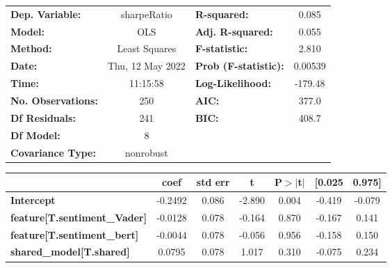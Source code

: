 \begin{center}
\begin{tabular}{lclc}
\toprule
\textbf{Dep. Variable:}                       &   sharpeRatio    & \textbf{  R-squared:         } &     0.085   \\
\textbf{Model:}                               &       OLS        & \textbf{  Adj. R-squared:    } &     0.055   \\
\textbf{Method:}                              &  Least Squares   & \textbf{  F-statistic:       } &     2.810   \\
\textbf{Date:}                                & Thu, 12 May 2022 & \textbf{  Prob (F-statistic):} &  0.00539    \\
\textbf{Time:}                                &     11:15:58     & \textbf{  Log-Likelihood:    } &   -179.48   \\
\textbf{No. Observations:}                    &         250      & \textbf{  AIC:               } &     377.0   \\
\textbf{Df Residuals:}                        &         241      & \textbf{  BIC:               } &     408.7   \\
\textbf{Df Model:}                            &           8      & \textbf{                     } &             \\
\textbf{Covariance Type:}                     &    nonrobust     & \textbf{                     } &             \\
\bottomrule
\end{tabular}
\begin{tabular}{lcccccc}
                                              & \textbf{coef} & \textbf{std err} & \textbf{t} & \textbf{P$> |$t$|$} & \textbf{[0.025} & \textbf{0.975]}  \\
\midrule
\textbf{Intercept}                            &      -0.2492  &        0.086     &    -2.890  &         0.004        &       -0.419    &       -0.079     \\
\textbf{feature[T.sentiment\_Vader]}          &      -0.0128  &        0.078     &    -0.164  &         0.870        &       -0.167    &        0.141     \\
\textbf{feature[T.sentiment\_bert]}           &      -0.0044  &        0.078     &    -0.056  &         0.956        &       -0.158    &        0.150     \\
\textbf{shared\_model[T.shared]}              &       0.0795  &        0.078     &     1.017  &         0.310        &       -0.075    &        0.234     \\

\end{tabular}
\end{center}
